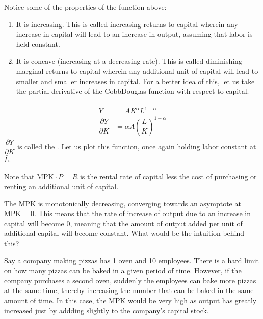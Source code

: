 \documentclass[letterpaper,10pt,english]{jupyterBook}
\begin{document}
\noindent{}

\sphinxAtStartPar
Notice some of the properties of the function above:
\begin{enumerate}
%
\item {} 
\sphinxAtStartPar
It is increasing. This is called increasing returns to capital wherein any increase in capital will lead to an increase in output, assuming that labor is held constant.

\item {} 
\sphinxAtStartPar
It is concave (increasing at a decreasing rate). This is called diminishing marginal returns to capital wherein any additional unit of capital will lead to smaller and smaller increases in capital. For a better idea of this, let us take the partial derivative of the Cobb\sphinxhyphen{}Douglas function with respect to capital.

\end{enumerate}
\begin{equation*}
\begin{split}\begin{aligned}
Y &= A K^\alpha L^{1 - \alpha} \\
\dfrac{\partial Y}{\partial K} &= \alpha A \left ( \dfrac{L}{K} \right )^{1 - \alpha} 
\end{aligned}\end{split}
\end{equation*}
\sphinxAtStartPar
\(\dfrac{\partial Y}{\partial K}\) is called the . Let us plot this function, once again holding labor constant at \(\bar L\).

\noindent{}

\sphinxAtStartPar
Note that \(\text{MPK} \cdot P = R\) is the rental rate of capital less the cost of purchasing or renting an additional unit of capital.

\sphinxAtStartPar
The MPK is monotonically decreasing, converging towards an asymptote at \(\text{MPK} = 0\). This means that the rate of increase of output due to an increase in capital will become 0, meaning that the amount of output added per unit of additional capital will become constant. What would be the intuition behind this?

\sphinxAtStartPar
Say a company making pizzas has 1 oven and 10 employees. There is a hard limit on how many pizzas can be baked in a given period of time. However, if the company purchases a second oven, suddenly the employees can bake more pizzas at the same time, thereby increasing the number that can be baked in the same amount of time. In this case, the MPK would be very high as output has greatly increased just by addding slightly to the company’s capital stock.
\end{document}
